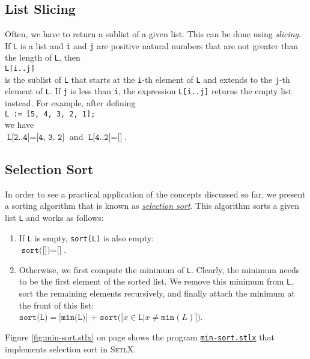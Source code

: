 \subsection{List Slicing}
Often, we have to return a sublist of a given list.  This can be done using \emph{slicing}.  If
\texttt{L} is a list and \texttt{i} and \texttt{j} are positive natural numbers that are not greater
than the length of \texttt{L}, then
\\[0.2cm]
\hspace*{1.3cm}
\texttt{L[i..j]}
\\[0.2cm]
is the sublist of \texttt{L} that starts at the \texttt{i}-th element of \texttt{L} and extends to
the \texttt{j}-th element of \texttt{L}.  If \texttt{j} is less than \texttt{i}, the expression
\texttt{L[i..j]} returns the empty list instead.  For example, after defining
\\[0.2cm]
\hspace*{1.3cm}
\texttt{L := [5, 4, 3, 2, 1];}
\\[0.2cm]
we have 
\\[0.2cm]
\hspace*{1.3cm}
$\texttt{L[2..4]} = \texttt{[4, 3, 2]}$ \quad and \quad $\texttt{L[4..2]} = \texttt{[]}$.


\subsection{Selection Sort}
In order to see a practical application of the concepts discussed so far, we present a sorting
algorithm that is known as \href{https://en.wikipedia.org/wiki/Selection_sort}{\emph{selection sort}}.
This algorithm sorts a given list \texttt{L} and works as follows:
\begin{enumerate}
\item If \texttt{L} is empty, \texttt{sort(L)} is also empty:
      \\[0.2cm]
      \hspace*{1.3cm}
      $\texttt{sort([])} = \texttt{[]}$.
\item Otherwise, we first compute the minimum of \texttt{L}.  Clearly, the minimum needs to be the
      first element of the sorted list.  We remove this minimum from \texttt{L}, sort the remaining
      elements recursively, and finally attach the minimum at the front of this list:
      \\[0.2cm]
      \hspace*{1.3cm}
      $\texttt{sort(L)} = \texttt{[min(L)] + sort([}x \in \texttt{L} \texttt{|} x \not= \texttt{min}(L)\texttt{])}$.
\end{enumerate}
Figure \ref{fig:min-sort.stlx} on page \pageref{fig:min-sort.stlx} shows the program
\href{https://github.com/karlstroetmann/Logik/blob/master/SetlX/min-sort.stlx}{\texttt{min-sort.stlx}}
that implements selection sort  in \textsc{SetlX}. 

